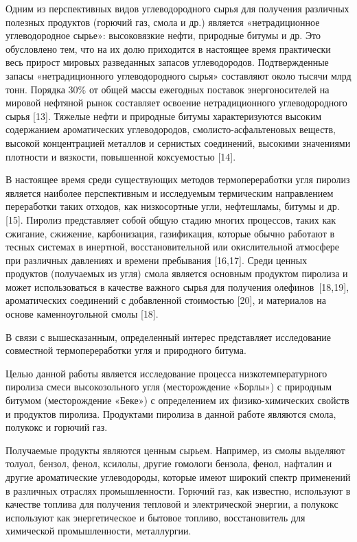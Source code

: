 Одним из перспективных видов углеводородного сырья для получения
различных полезных продуктов (горючий газ, смола и др.) является
«нетрадиционное углеводородное сырье»: высоковязкие нефти, природные
битумы и др. Это обусловлено тем, что на их долю приходится в настоящее
время практически весь прирост мировых разведанных запасов
углеводородов. Подтвержденные запасы «нетрадиционного углеводородного
сырья» составляют около тысячи млрд тонн. Порядка 30\% от общей массы
ежегодных поставок энергоносителей на мировой нефтяной рынок составляет
освоение нетрадиционного углеводородного сырья {[}13{]}. Тяжелые нефти и
природные битумы характеризуются высоким содержанием ароматиче­ских
углеводородов, смолисто-ас­фальтеновых веществ, высокой кон­центрацией
металлов и сернистых соединений, высокими значениями плотности и
вязкости, повышенной коксуемостью {[}14{]}.

В настоящее время среди существующих методов термопереработки угля
пиролиз является наиболее перспективным и исследуемым термическим
направлением переработки таких отходов, как низкосортные угли,
нефтешламы, битумы и др. {[}15{]}. Пиролиз представляет собой общую
стадию многих процессов, таких как сжигание, сжижение, карбонизация,
газификация, которые обычно работают в тесных системах в инертной,
восстановительной или окислительной атмосфере при различных давлениях и
времени пребывания {[}16,17{]}. Среди ценных продуктов (получаемых из
угля) смола является основным продуктом пиролиза и может использоваться
в качестве важного сырья для получения олефинов~{[}18,19{]},
ароматических соединений с добавленной стоимостью {[}20{]}, и материалов
на основе каменноугольной смолы {[}18{]}.~

В связи с вышесказанным, определенный интерес представляет исследование
совместной термопереработки угля и природного битума.

Целью данной работы является исследование процесса низкотемпературного
пиролиза смеси высокозольного угля (месторождение «Борлы») с природным
битумом (месторождение «Беке») с определением их физико-химических
свойств и продуктов пиролиза. Продуктами пиролиза в данной работе
являются смола, полукокс и горючий газ.

Получаемые продукты являются ценным сырьем. Например, из смолы выделяют
толуол, бензол, фенол, ксилолы, другие гомологи бензола, фенол, нафталин
и другие ароматические углеводороды, которые имеют широкий спектр
применений в различных отраслях промышленности. Горючий газ, как
известно, используют в качестве топлива для получения тепловой и
электрической энергии, а полукокс используют как энергетическое и
бытовое топливо, восстановитель для химической промышленности,
металлургии.


